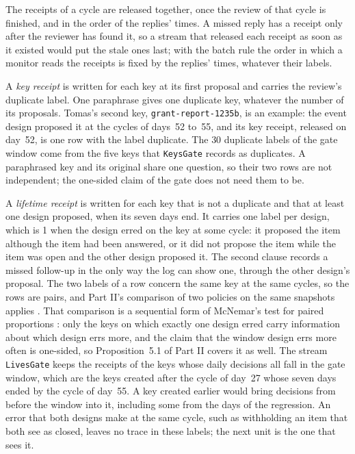 \documentclass[11pt]{article}
\newcommand{\code}[1]{\texttt{#1}}
\theoremstyle{definition}
\theoremstyle{plain}
\begin{document}
The receipts of a cycle are released together, once the review of that cycle is finished, and in
the order of the replies' times. A missed reply has a receipt only after the reviewer has found it,
so a stream that released each receipt as soon as it existed would put the stale ones last; with the
batch rule the order in which a monitor reads the receipts is fixed by the replies' times, whatever
their labels.

A \emph{key receipt} is written for each key at its first proposal and carries the review's
duplicate label. One paraphrase gives one duplicate key, whatever the number of its proposals.
Tomas's second key, \code{grant-report-1235b}, is an example: the event design proposed it at the
cycles of days~52 to~55, and its key receipt, released on day~52, is one row with the label
duplicate. The $30$ duplicate labels of the gate window come from the five keys that
\code{KeysGate} records as duplicates. A paraphrased key and its original share one question, so
their two rows are not independent; the one-sided claim of the gate does not need them to be.

A \emph{lifetime receipt} is written for each key that is not a duplicate and that at least one
design proposed, when its seven days end. It carries one label per design, which is 1 when the
design erred on the key at some cycle: it proposed the item although the item had been answered,
or it did not propose the item while the item was open and the other design proposed it. The second
clause records a missed follow-up in the only way the log can show one, through the other design's
proposal. The two labels of a row concern the same key at the same cycles, so the rows are pairs,
and Part II's comparison of two policies on the same snapshots applies \cite[Section~5.4]{part2}.
That comparison is a sequential form of McNemar's test for paired proportions \cite{mcnemar}: only
the keys on which exactly one design erred carry information about which design errs more, and the
claim that the window design errs more often is one-sided, so Proposition~5.1 of Part II covers it
as well. The
stream \code{LivesGate} keeps the receipts of the keys whose daily decisions all fall in the gate
window, which are the keys created after the cycle of day~27 whose seven days ended by the cycle of
day~55. A key created earlier would bring decisions from before the window into it, including some
from the days of the regression. An error that both designs make at the same cycle, such as
withholding an item that both see as closed, leaves no trace in these labels; the next unit is the
one that sees it.
\end{document}
